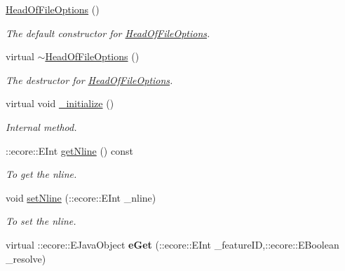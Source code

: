 \begin{DoxyCompactItemize}
\item 
\hypertarget{classFMS__Data_1_1HeadOfFileOptions_a4b35674cf3314b896c0414897774546b}{
\hyperlink{classFMS__Data_1_1HeadOfFileOptions_a4b35674cf3314b896c0414897774546b}{HeadOfFileOptions} ()}
\label{classFMS__Data_1_1HeadOfFileOptions_a4b35674cf3314b896c0414897774546b}

\begin{DoxyCompactList}\small\item\em The default constructor for \hyperlink{classFMS__Data_1_1HeadOfFileOptions}{HeadOfFileOptions}. \item\end{DoxyCompactList}\item 
\hypertarget{classFMS__Data_1_1HeadOfFileOptions_af6d748e38975389699860cbcd52b0174}{
virtual \hyperlink{classFMS__Data_1_1HeadOfFileOptions_af6d748e38975389699860cbcd52b0174}{$\sim$HeadOfFileOptions} ()}
\label{classFMS__Data_1_1HeadOfFileOptions_af6d748e38975389699860cbcd52b0174}

\begin{DoxyCompactList}\small\item\em The destructor for \hyperlink{classFMS__Data_1_1HeadOfFileOptions}{HeadOfFileOptions}. \item\end{DoxyCompactList}\item 
\hypertarget{classFMS__Data_1_1HeadOfFileOptions_a5692b73da4ff6c24bdfd039d59f4c44d}{
virtual void \hyperlink{classFMS__Data_1_1HeadOfFileOptions_a5692b73da4ff6c24bdfd039d59f4c44d}{\_\-initialize} ()}
\label{classFMS__Data_1_1HeadOfFileOptions_a5692b73da4ff6c24bdfd039d59f4c44d}

\begin{DoxyCompactList}\small\item\em Internal method. \item\end{DoxyCompactList}\item 
::ecore::EInt \hyperlink{classFMS__Data_1_1HeadOfFileOptions_a8e7961bf9c852099fdbfadff4198ef9d}{getNline} () const 
\begin{DoxyCompactList}\small\item\em To get the nline. \item\end{DoxyCompactList}\item 
void \hyperlink{classFMS__Data_1_1HeadOfFileOptions_a8195896416608b4a92f4d9647609ae2f}{setNline} (::ecore::EInt \_\-nline)
\begin{DoxyCompactList}\small\item\em To set the nline. \item\end{DoxyCompactList}\item 
\hypertarget{classFMS__Data_1_1HeadOfFileOptions_ae924c985aec8abdd95888887d0b2e424}{
virtual ::ecore::EJavaObject {\bfseries eGet} (::ecore::EInt \_\-featureID,::ecore::EBoolean \_\-resolve)}
\label{classFMS__Data_1_1HeadOfFileOptions_ae924c985aec8abdd95888887d0b2e424}


\end{DoxyCompactItemize}
